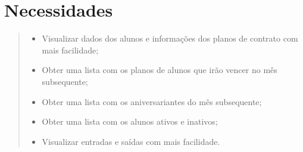 \section[Necessidades]{Necessidades}
\begin{quote}
    \begin{itemize}
        \item Visualizar dados dos alunos e informações dos planos de contrato com mais facilidade;
		\item Obter uma lista com os planos de alunos que irão vencer no mês subsequente;
		\item Obter uma lista com os aniversariantes do mês subsequente;
		\item Obter uma lista com os alunos ativos e inativos;
		\item Visualizar entradas e saídas com mais facilidade.
    \end{itemize}
\end{quote}